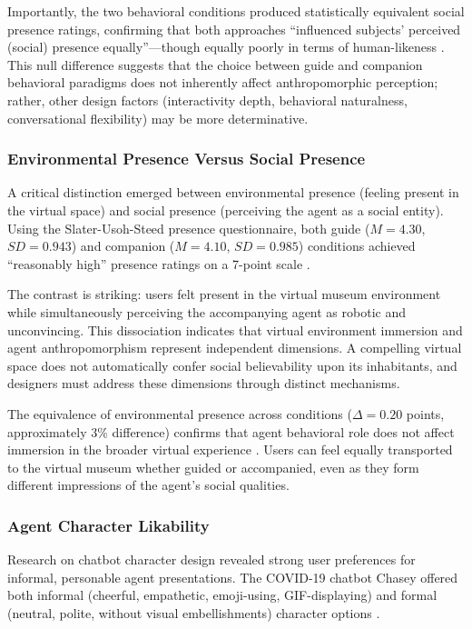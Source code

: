 \documentclass[manuscript,anonymous,sigconf]{acmart}
\begin{document}
Importantly, the two behavioral conditions produced statistically equivalent social presence ratings, confirming that both approaches ``influenced subjects' perceived (social) presence equally''---though equally poorly in terms of human-likeness \cite{A82}. This null difference suggests that the choice between guide and companion behavioral paradigms does not inherently affect anthropomorphic perception; rather, other design factors (interactivity depth, behavioral naturalness, conversational flexibility) may be more determinative.

\subsubsection{Environmental Presence Versus Social Presence}

A critical distinction emerged between environmental presence (feeling present in the virtual space) and social presence (perceiving the agent as a social entity). Using the Slater-Usoh-Steed presence questionnaire, both guide ($M = 4.30$, $SD = 0.943$) and companion ($M = 4.10$, $SD = 0.985$) conditions achieved ``reasonably high'' presence ratings on a 7-point scale \cite{A82}.

The contrast is striking: users felt present in the virtual museum environment while simultaneously perceiving the accompanying agent as robotic and unconvincing. This dissociation indicates that virtual environment immersion and agent anthropomorphism represent independent dimensions. A compelling virtual space does not automatically confer social believability upon its inhabitants, and designers must address these dimensions through distinct mechanisms.

The equivalence of environmental presence across conditions ($\Delta = 0.20$ points, approximately 3\% difference) confirms that agent behavioral role does not affect immersion in the broader virtual experience \cite{A82}. Users can feel equally transported to the virtual museum whether guided or accompanied, even as they form different impressions of the agent's social qualities.

\subsubsection{Agent Character Likability}

Research on chatbot character design revealed strong user preferences for informal, personable agent presentations. The COVID-19 chatbot Chasey offered both informal (cheerful, empathetic, emoji-using, GIF-displaying) and formal (neutral, polite, without visual embellishments) character options \cite{A79}.
\end{document}

